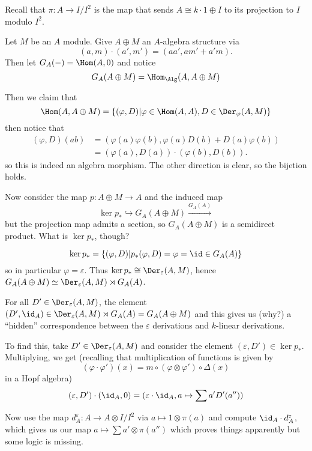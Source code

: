 \documentclass[12pt]{article}
\begin{document}
\begin{prf}
	Recall that $\pi:A\to I/I^2$ is the map that sends $A\cong k\cdot 1\oplus I$ to its projection to $I$ modulo $I^2$.

	Let $M$ be an $A$ module. Give $A\oplus M$ an $A$-algebra structure via 
	\[(a,m)\cdot(a',m')=(aa',am'+a'm).\]
	Then let $G_A(-)=\Hom(A,0)$ and notice 
	\[G_A(A\oplus M)=\Hom_\Alg(A,A\oplus M)\]

	Then we claim that 
	\[\Hom(A,A\oplus M)=\{(\varphi,D)|\varphi\in\Hom(A,A),D\in \Der_\varphi(A,M)\}\]
	then notice that 
	\begin{align*}
		(\varphi,D)(ab) &= (\varphi(a)\varphi(b),\varphi(a)D(b)+D(a)\varphi(b))\\
		&=(\varphi(a),D(a))\cdot(\varphi(b),D(b)).
	\end{align*}
	so this is indeed an algebra morphism. The other direction is clear, so the bijetion holds. 

	Now consider the map $p:A\oplus M\to A$ and the induced map
	\[\ker p_\ast\hookrightarrow G_A(A\oplus M)\xrightarrow{G_A(A)}\]
	but the projection map admits a section, so $G_A(A\oplus M)$ is a semidirect product. What is $\ker p_\ast$, though?

	\[\ker p_\ast=\{(\varphi,D)|p_\ast(\varphi,D)=\varphi=\id\in G_A(A)\}\]
	so in particular $\varphi=\varepsilon$. Thus $\ker p_\ast\cong \Der_\varepsilon(A,M)$,
	hence $G_A(A\oplus M)\simeq \Der_\varepsilon(A,M)\rtimes G_A(A)$.

	For all $D'\in \Der_\varepsilon(A,M)$, the element $(D',\id_A)\in\Der_\varepsilon(A,M)\rtimes G_A(A)=G_A(A\oplus M)$
	and this gives us (why?) a ``hidden'' correspondence between the $\varepsilon$ derivations and $k$-linear derivations.

	To find this, take $D'\in\Der_\varepsilon(A,M)$ and consider the element $(\varepsilon, D')\in\ker p_\ast$.
	Multiplying, we get (recalling that multiplication of functions is given by 
	\[(\varphi\cdot\varphi')(x)=m\circ (\varphi\otimes \varphi')\circ \Delta(x)\]
	in a Hopf algebra)
	\[(\varepsilon, D')\cdot(\id_A,0)=(\varepsilon\cdot\id_A,a\mapsto \sum a'D'(a''))\]

	Now use the map $d_A^\varepsilon:A\to A\otimes I/I^2$ via $a\mapsto 1\otimes \pi(a)$ and compute $\id_A\cdot d_A^\varepsilon$, which gives us our map 
	$a\mapsto \sum a'\otimes \pi(a'')$ which proves things apparently but some logic is missing.
\end{prf}
\end{document}
